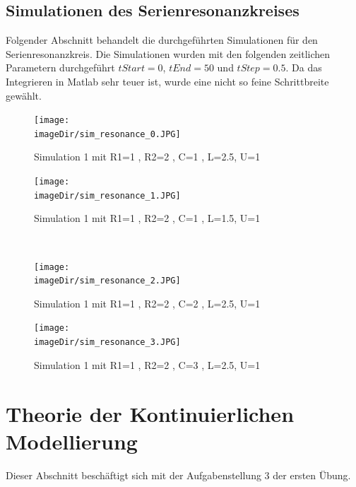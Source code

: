 \documentclass[11pt, a4paper, twoside]{article}   	%
\newcommand{\imageDir}{./images/}
\begin{document}
\subsection{Simulationen des Serienresonanzkreises}
Folgender Abschnitt behandelt die durchgeführten Simulationen für den Serienresonanzkreis. Die Simulationen wurden mit den folgenden zeitlichen Parametern durchgeführt $tStart= 0$, $tEnd  = 50$ und $tStep = 0.5$. Da das Integrieren in Matlab sehr teuer ist, wurde eine nicht so feine Schrittbreite gewählt.
\ \newline
\begin{figure}[h]
\centering
\texttt{[image: \\imageDir/sim\_resonance\_0.JPG]}
\caption{Simulation 1 mit R1=1 , R2=2 , C=1 , L=2.5, U=1}
\label{fig:sim-resonance-01}
\end{figure}

\begin{figure}[h]
\centering
\texttt{[image: \\imageDir/sim\_resonance\_1.JPG]}
\caption{Simulation 1 mit R1=1 , R2=2 , C=1 , L=1.5, U=1}
\label{fig:sim-resonance-01}
\end{figure}
\ \newpage

\begin{figure}[h]
\centering
\texttt{[image: \\imageDir/sim\_resonance\_2.JPG]}
\caption{Simulation 1 mit R1=1 , R2=2 , C=2 , L=2.5, U=1}
\label{fig:sim-resonance-01}
\end{figure}

\begin{figure}[h]
\centering
\texttt{[image: \\imageDir/sim\_resonance\_3.JPG]}
\caption{Simulation 1 mit R1=1 , R2=2 , C=3 , L=2.5, U=1}
\label{fig:sim-resonance-01}
\end{figure}
\newpage

\section{Theorie der Kontinuierlichen Modellierung}
Dieser Abschnitt beschäftigt sich mit der Aufgabenstellung 3 der ersten Übung.
\end{document}
